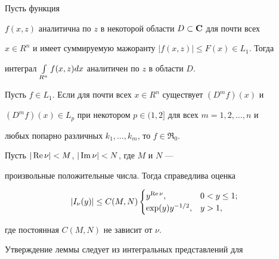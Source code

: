\begin{lem}


Пусть функция


$f(x,z)$ аналитична по $z$ в некоторой области $D\subset{\bold C}$ для почти всех


$x\in R^n$ и имеет суммируемую мажоранту $|f(x,z)|\leq F(x)\in L_1$. Тогда


интеграл $\int\limits_{R^n} f(x,z)dx$ аналитичен по $z$ в области $D$.


\end{lem}





\begin{lem}


Пусть $f\in L_1$. Если для почти всех $x\in R^n$ существует $(D^mf)(x)$ и


$(D^mf)(x)\in L_p$ при некотором $p\in (1,2]$ для всех $m=1,2,\dotsc,n$ и


любых попарно различных $k_1,\dotsc,k_m$, то $f\in{\Re}_0$.


\end{lem}





\begin{lem}


Пусть $|\operatorname{Re}\nu|<M$, $|\operatorname{Im}\nu|<N$, где $M$ и $N$ ---


произвольные положительные числа. Тогда справедлива оценка


$$


|I_{\nu}(y)| \leq C(M,N)


\begin{cases}


y^{\R\nu}, & 0  < y \leq 1; \\


\exp(y)y^{-1/2}, & y > 1,


\end{cases}


$$


где постоянная $C(M,N)$ не зависит от $\nu$.


\end{lem}





Утверждение леммы следует из интегральных представлений для



